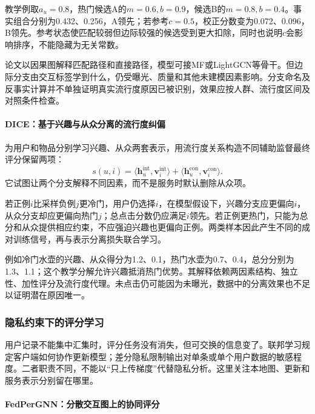 教学例取$a_u=0.8$，热门候选A的$m=0.6,b=0.9$，候选B的$m=0.8,b=0.4$。事实组合分别为0.432、0.256，A领先；若参考$c=0.5$，校正分数变为0.072、0.096，B领先。参考状态使匹配较弱但边际较强的候选受到更大扣除，同时也说明$c$会影响排序，不能隐藏为无关常数。

论文以因果图解释匹配路径和直接路径，模型可接MF或LightGCN等骨干。但边际分支由交互标签学到什么，仍受曝光、质量和其他未建模因素影响。分支命名及反事实计算并不单独证明真实流行度原因已被识别，效果应按人群、流行度区间及对照条件检查。

\paragraph{DICE：基于兴趣与从众分离的流行度纠偏}
\label{sec:rs-dice}

为用户和物品分别学习兴趣、从众两套表示，用流行度关系构造不同辅助监督最终评分保留两项：
\begin{equation}
 s(u,i)=
 \langle\bm h_u^{\mathrm{int}},\bm v_i^{\mathrm{int}}\rangle+
 \langle\bm h_u^{\mathrm{con}},\bm v_i^{\mathrm{con}}\rangle.
 \label{eq:rs-dice}
\end{equation}
它试图让两个分支解释不同因素，而不是服务时默认删除从众项。

若正例$i$比采样负例$j$更冷门，用户仍选择$i$，在模型假设下，兴趣分支应更偏向$i$，从众分支却应更偏向热门$j$；总点击分数仍应满足$i$领先。若正例更热门，只能为总分和从众提供相应约束，不应强迫兴趣也更偏向正例。两类样本因此产生不同的成对训练信号，再与表示分离损失联合学习。

例如冷门水壶的兴趣、从众得分为1.2、0.1，热门水壶为0.7、0.4，总分分别为1.3、1.1；这个教学分解允许兴趣抵消热门优势。其解释依赖两因素结构、独立性、加性评分及流行度代理。未点击仍可能因为未曝光，数据中的分离效果也不足以证明潜在原因唯一。

\subsubsection{隐私约束下的评分学习}
\label{sec:rs-private-scoring}

用户记录不能集中汇集时，评分任务没有消失，但可交换的信息变了。联邦学习规定客户端如何协作更新模型；差分隐私限制输出对单条或单个用户数据的敏感程度。二者职责不同，不能以“只上传梯度”代替隐私分析。这里关注本地图、更新和服务表示分别留在哪里。

\paragraph{FedPerGNN：分散交互图上的协同评分}
\label{sec:rs-fedpergnn}

